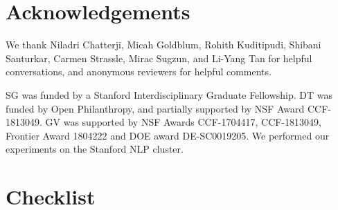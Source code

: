 \documentclass{article}
\begin{document}
\section*{Acknowledgements}

We thank Niladri Chatterji, Micah Goldblum, Rohith Kuditipudi, Shibani Santurkar, Carmen Strassle,  Mirac Sugzun, and Li-Yang Tan for helpful conversations, and anonymous reviewers for helpful comments. 

SG was funded by a  Stanford Interdisciplinary Graduate Fellowship.
DT was funded by Open Philanthropy, and partially supported by NSF Award CCF-1813049.  GV was supported by NSF Awards CCF-1704417, CCF-1813049, Frontier Award 1804222 and DOE award DE-SC0019205.
We performed our experiments on the Stanford NLP cluster.



\section*{Checklist}
\end{document}

